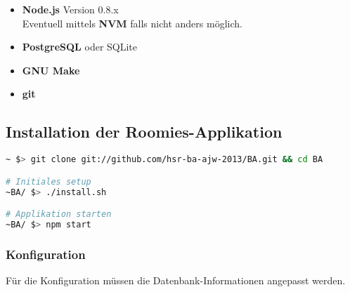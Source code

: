 \begin{itemize}
	\item \textbf{Node.js} Version 0.8.x \cite{nodejs}\\
		Eventuell mittels \textbf{NVM} \cite{NVM} falls nicht anders möglich.
	\item \textbf{PostgreSQL} \cite{PostgreSQL} oder SQLite \cite{SQLite}
	\item \textbf{GNU Make} \cite{GNUmake}
	\item \textbf{git} \cite{git}
\end{itemize}

\subsection*{Installation der Roomies-Applikation}

\begin{lstlisting}[language=Bash, caption=Installationsanleitung ohne Vagrant]
~ $> git clone git://github.com/hsr-ba-ajw-2013/BA.git && cd BA

# Initiales setup
~BA/ $> ./install.sh

# Applikation starten
~BA/ $> npm start
\end{lstlisting}

\subsubsection*{Konfiguration}
Für die Konfiguration müssen die Datenbank-Informationen angepasst werden.